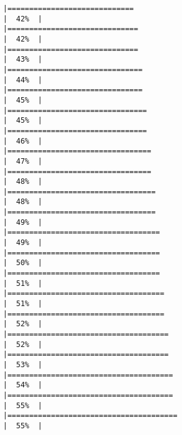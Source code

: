 \documentclass[
]{book}
\begin{document}
\begin{verbatim}
|=============================                                         |  42%  |                                                                              |==============================                                        |  42%  |                                                                              |==============================                                        |  43%  |                                                                              |===============================                                       |  44%  |                                                                              |===============================                                       |  45%  |                                                                              |================================                                      |  45%  |                                                                              |================================                                      |  46%  |                                                                              |=================================                                     |  47%  |                                                                              |=================================                                     |  48%  |                                                                              |==================================                                    |  48%  |                                                                              |==================================                                    |  49%  |                                                                              |===================================                                   |  49%  |                                                                              |===================================                                   |  50%  |                                                                              |===================================                                   |  51%  |                                                                              |====================================                                  |  51%  |                                                                              |====================================                                  |  52%  |                                                                              |=====================================                                 |  52%  |                                                                              |=====================================                                 |  53%  |                                                                              |======================================                                |  54%  |                                                                              |======================================                                |  55%  |                                                                              |=======================================                               |  55%  |                                                                              
\end{verbatim}
\end{document}
